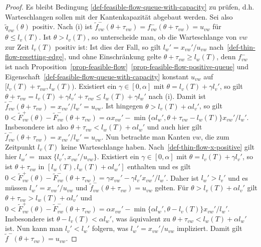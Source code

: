 \begin{proof}
	Es bleibt Bedingung \ref{def-feasible-flow-queue-with-capacity} zu prüfen, d.h. Warteschlangen sollen mit der Kantenkapazität abgebaut werden.
	Sei also $\tilde{q}_{vw}(\theta)$ positiv.
	Nach (i) ist $\tilde{f}_{vw}^-(\theta + \tau_{vw}) = f_{vw}^-(\theta + \tau_{vw}) = u_{vw}$ für $\theta\leq l_v(T)$.
	Ist $\theta > l_v(T)$, so unterscheide man, ob die Warteschlange von $vw$ zur Zeit $l_v(T)$ positiv ist:
	Ist dies der Fall, so gilt $l_w' = x_{vw}' / u_{vw}$ nach~\ref{def-thin-flow-resetting-edge}, und ohne Einschränkung gelte $\theta + \tau_{vw} \geq l_w(T)$, denn $f_{vw}^-$ ist nach Proposition~\ref{prop-feasible-flow}~\ref{prop-feasible-flow-positive-queue} und Eigenschaft~\ref{def-feasible-flow-queue-with-capacity} konstant $u_{vw}$ auf $[l_v(T)+\tau_{vw},l_w(T))$.
	Existiert ein $\gamma\in [0, \alpha]$ mit $\theta = l_v(T) + \gamma l_v'$, so gilt $\theta + \tau_{vw} = l_v(T) + \gamma l_v' + \tau_{vw} \leq l_w(T) + \gamma l_w'$ nach (i).
	Damit ist $\tilde{f}^-_{vw}(\theta + \tau_{vw}) = x_{vw}'/l_w' = u_{vw}$.
	Ist  hingegen $\theta > l_v(T) + \alpha l_v'$, so gilt $0<\tilde{F}^+_{vw}(\theta) - \tilde{F}_{vw}^-(\theta +\tau_{vw}) = \alpha x_{vw}' - \min \{ \alpha l_w', \theta + \tau_{vw} - l_w(T) \} x_{vw}' / l_w'$. Insbesondere ist also $\theta + \tau_{vw} < l_w(T) + \alpha l_w'$ und auch hier gilt $\tilde{f}^-_{vw}(\theta + \tau_{vw}) = x_{vw}'/l_w' = u_{vw}$.	
	Nun betrachte man Kanten $vw$, die zum Zeitpunkt $l_v(T)$ keine Warteschlange haben.
	Nach~\ref{def-thin-flow-x-positive} gilt hier $l_w' = \max \{ l_v', x_{vw}' / u_{vw}  \}$.
	Existiert ein $\gamma\in [0, \alpha]$ mit $\theta = l_v(T) + \gamma l_v'$, so ist $\theta+\tau_{vw}$ in $[l_w(T), l_w(T) + \alpha l_w']$ enthalten und es gilt $0<\tilde{F}_{vw}^+(\theta) - \tilde{F}_{vw}^-(\theta + \tau_{vw})= \gamma x_{vw}' - \gamma l_v' x_{vw}'/l_w'$.
	Daher ist $l_w' > l_v'$ und es müssen $l_w' = x_{vw}'/u_{vw}$ und $\tilde{f}_{vw}^-(\theta + \tau_{vw}) = u_{vw}$ gelten.
	Für $\theta > l_v(T) + \alpha l_v'$ gilt $\theta + \tau_{vw} > l_w(T) + \alpha l_v'$ und $0 < \tilde{F}_{vw}^+(\theta) - \tilde{F}_{vw}^-(\theta + \tau_{vw}) = \alpha x_{vw}' - \min \{ \alpha l_w', \theta - l_v(T) \}x_{vw}'/l_w'$.
	Insbesondere ist $\theta - l_v(T) < \alpha l_w'$, was äquivalent zu $\theta + \tau_{vw} < l_w(T) + \alpha l_w'$ ist.
	Nun kann man $l_v' < l_w'$ folgern, was $l_w' = x_{vw}'/u_{vw}$ impliziert.
	Damit gilt $\tilde{f}^-(\theta + \tau_{vw}) = u_{vw}$.


\end{proof}
